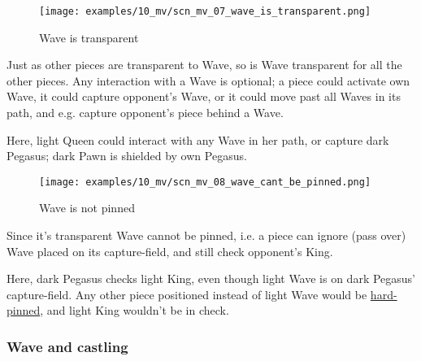 \vspace*{-1.4\baselineskip}
\noindent
\begin{figure}[!h]
\texttt{[image: examples/10\_mv/scn\_mv\_07\_wave\_is\_transparent.png]}
\vspace*{-1.3\baselineskip}
\caption{Wave is transparent}
\label{fig:scn_mv_07_wave_is_transparent}
\end{figure}

\vspace*{-0.4\baselineskip}
Just as other pieces are transparent to Wave, so is Wave transparent for all the
other pieces. Any interaction with a Wave is optional; a piece could activate own
Wave, it could capture opponent's Wave, or it could move past all Waves in its path,
and e.g. capture opponent's piece behind a Wave.

\noindent
Here, light Queen could interact with any Wave in her path, or capture dark Pegasus;
dark Pawn is shielded by own Pegasus.

\clearpage %

\vspace*{-2.1\baselineskip}
\noindent
\begin{figure}[!h]
\texttt{[image: examples/10\_mv/scn\_mv\_08\_wave\_cant\_be\_pinned.png]}
\vspace*{-1.3\baselineskip}
\caption{Wave is not pinned}
\label{fig:scn_mv_08_wave_cant_be_pinned}
\end{figure}

\vspace*{-0.5\baselineskip}
Since it's transparent Wave cannot be pinned, i.e. a piece can ignore (pass over)
Wave placed on its capture-field, and still check opponent's King.

Here, dark Pegasus checks light King, even though light Wave is on dark Pegasus'
capture-field. Any other piece positioned instead of light Wave would be
\href{https://en.wikipedia.org/wiki/Pin_(chess)#Absolute_pin}{hard-pinned},
and light King wouldn't be in check.

\clearpage %

\subsubsection*{Wave and castling}
\label{sec:Miranda's veil/Wave/Cascading Waves/Wave and castling}

